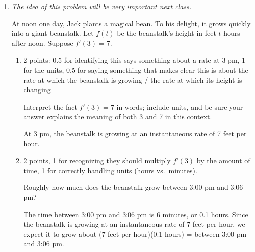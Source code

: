 \documentclass{article}
\begin{document}
\begin{enumerate}[resume]
\item \label{beanstalk}


  \emph{The idea of this problem will be very important next class.}

  At noon one day, Jack plants a magical bean. To his delight, it grows quickly into a giant beanstalk. Let $f(t)$ be the beanstalk's height in feet $t$ hours after noon. Suppose $f'(3) = 7$.

  \begin{enumerate}

  \item

    \begin{grading}
      2 points: 0.5 for identifying this says something about a rate at 3 pm, 1 for the units, 0.5 for saying something that makes clear this is about the rate at which the beanstalk is growing / the rate at which its height is changing 
    \end{grading}

    \begin{problem}[\vfill]
      Interpret the fact $f'(3) = 7$ in words; include units, and be sure your answer explains the meaning of both 3 and 7 in this context. 
    \end{problem}

    \begin{solution}
      At 3 pm, the beanstalk is growing at an instantaneous rate of 7 feet per hour. 
    \end{solution}

  \item \label{beanstalk-concrete-example}

    \begin{grading}
      2 points, 1 for recognizing they should multiply $f'(3)$ by the amount of time, 1 for correctly handling units (hours vs.\ minutes). 
    \end{grading}

    \begin{problem}[\vfill] 
      Roughly how much does the beanstalk grow between 3:00 pm and 3:06 pm?
    \end{problem}

    \begin{solution}
      The time between 3:00 pm and 3:06 pm is 6 minutes, or 0.1 hours. 
      Since the beanstalk is growing at an instantaneous rate of 7 feet per hour, we expect it to grow about (7 feet per hour)(0.1 hours) =  between 3:00 pm and 3:06 pm. 
    \end{solution}


\end{enumerate}
\end{enumerate}
\end{document}
